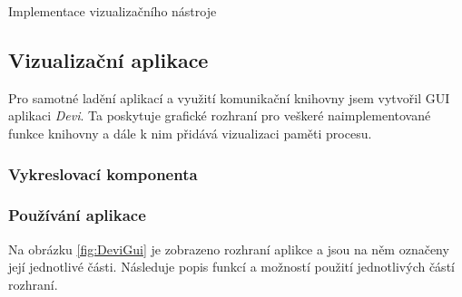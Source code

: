 \documentclass[bc,male,python,dept460]{diploma}						%
\begin{document}
\begin{section}{Implementace vizualizačního nástroje}
\begin{description}
		\end{description}
			
	\subsection{Vizualizační aplikace}
	Pro samotné ladění aplikací a využití komunikační knihovny jsem vytvořil GUI aplikaci \textit{Devi}.
	Ta poskytuje grafické rozhraní pro veškeré naimplementované funkce knihovny a dále k nim přidává vizualizaci paměti procesu.
	
	\subsubsection{Vykreslovací komponenta}
	
	\subsubsection{Používání aplikace}
	Na obrázku \ref{fig:DeviGui} je zobrazeno rozhraní aplikce a jsou na něm označeny její jednotlivé části. Následuje popis funkcí a možností použití
	jednotlivých částí rozhraní.
	
	

\end{section}
\end{document}
